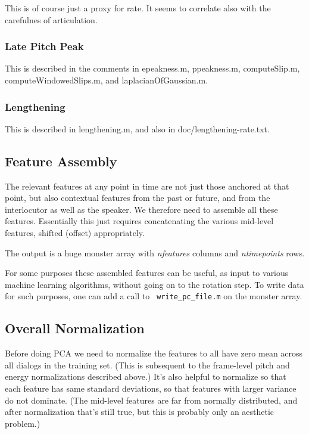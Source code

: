 \documentclass[11pt]{article}
\begin{document}
This is of course just a proxy for rate.  It seems to correlate also
with the carefulnes of articulation.

\subsubsection{Late Pitch Peak}

This is described in the comments in epeakness.m, ppeakness.m,
computeSlip.m, computeWindowedSlips.m, and laplacianOfGaussian.m. 

\subsubsection{Lengthening}

This is described in lengthening.m, and also in doc/lengthening-rate.txt.

\subsection{Feature Assembly}

The relevant features at any point in time are not just those anchored
at that point, but also contextual features from the past or future,
and from the interlocutor as well as the speaker.  We therefore need
to assemble all these features.  Essentially this just requires
concatenating the various mid-level features, shifted (offset)
appropriately.

The output is a huge monster array with {\it nfeatures} columns and
{\it ntimepoints} rows.

For some purposes these assembled features can be useful, as input to
various machine learning algorithms, without going on to the rotation
step.  To write data for such purposes, one can add a call to {\tt
  write\_pc\_file.m} on the monster array.


\subsection{Overall Normalization}

Before doing PCA we need to normalize the features to all have zero
mean across all dialogs in the training set.  (This is subsequent to
the frame-level pitch and energy normalizations described above.)
It's also helpful to normalize so that each feature has same standard
deviations, so that features with larger variance do not dominate.
(The mid-level features are far from normally distributed, and after
normalization that's still true, but this is probably only an
aesthetic problem.)
\end{document}
